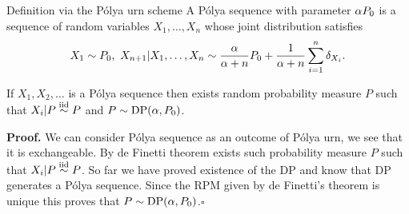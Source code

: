 \begin{frame}{Definition via the P\'olya urn scheme}
A P\'olya sequence with parameter $\alpha P_0$ is a sequence of random variables $X_1, \ldots, X_n$ whose joint distribution satisfies
\begin{equation*}
    X_1 \sim P_0,\ X_{n+1}|X_1,\ldots,X_n\sim \frac{\alpha}{\alpha + n}P_0 + \frac{1}{\alpha + n}\sum_{i=1}^n \delta_{X_i}.
\end{equation*}\pause

\begin{theorem}
If $X_1,X_2,\ldots $ is a P\'olya sequence then exists random probability measure $P$ such that $X_i|P\stackrel{\mbox{\scriptsize{iid}}}{\sim} P$ and $P\sim \text{DP}(\alpha, P_0)$.
\end{theorem}\pause

\textbf{Proof.}
We can consider P\'olya sequence as an outcome of P\'olya urn, we see that it is exchangeable. By de Finetti theorem exists such probability measure $P$ such that $X_i|P \stackrel{\mbox{\scriptsize{iid}}}{\sim} P$. So far we have proved existence of the DP and know that DP generates a P\'olya sequence. Since the RPM given by de Finetti's theorem is unique this proves that
$P\sim \text{DP}(\alpha, P_0)$.\hfill $\square$

\end{frame}







